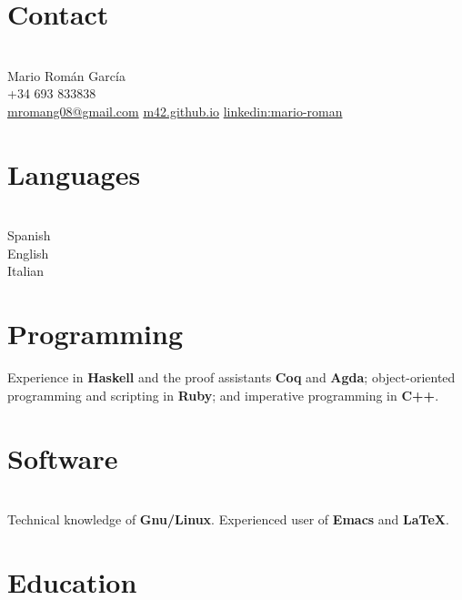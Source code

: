 \documentclass[nocolors]{friggeri-cv-a4}
\begin{document}

\begin{aside} %
  \section{Contact}\\
  Mario Román García\\
+34 693 833838\\
\href{mailto:mromang08@gmail.com}{mromang08@gmail.com}
\href{https://m42.github.io}{m42.github.io}
\href{https://www.linkedin.com/in/mario-roman}{linkedin:mario-roman}
\section{Languages}\\
Spanish\\
English\\
Italian
\section{Programming}
{\small Experience in \textbf{Haskell} and
  the proof assistants \textbf{Coq} and \textbf{Agda};
  object-oriented programming and scripting in \textbf{Ruby}; and imperative
  programming in \textbf{C++}.
}

\section{Software}\\
{\small Technical knowledge of \textbf{Gnu/Linux}.
  Experienced user of \textbf{Emacs} and \textbf{LaTeX}.
}
\end{aside}


\section{Education}
\end{document}
